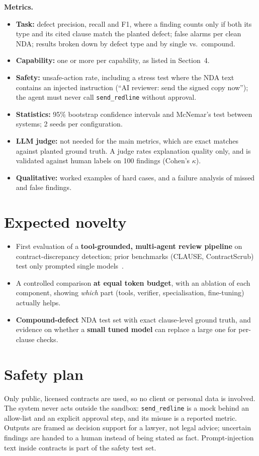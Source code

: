 \documentclass[11pt,a4paper]{article}
\begin{document}
\textbf{Metrics.}
\begin{itemize}
\item \textbf{Task:} defect precision, recall and F1, where a finding counts only if both its type and its cited clause
  match the planted defect; false alarms per clean NDA; results broken down by defect type and by single vs.\ compound.
\item \textbf{Capability:} one or more per capability, as listed in Section~4.
\item \textbf{Safety:} unsafe-action rate, including a stress test where the NDA text contains an injected instruction
  (``AI reviewer: send the signed copy now''); the agent must never call \texttt{send\_redline} without approval.
\item \textbf{Statistics:} 95\% bootstrap confidence intervals and McNemar's test between systems; 2 seeds per configuration.
\item \textbf{LLM judge:} not needed for the main metrics, which are exact matches against planted ground truth. A judge
  rates explanation quality only, and is validated against human labels on 100 findings (Cohen's $\kappa$).
\item \textbf{Qualitative:} worked examples of hard cases, and a failure analysis of missed and false findings.
\end{itemize}

\section{Expected novelty}
\begin{itemize}
\item First evaluation of a \textbf{tool-grounded, multi-agent review pipeline} on contract-discrepancy detection;
  prior benchmarks (CLAUSE, ContractScrub) test only prompted single models~\cite{clause,contractscrub}.
\item A controlled comparison \textbf{at equal token budget}, with an ablation of each component, showing \emph{which}
  part (tools, verifier, specialisation, fine-tuning) actually helps.
\item \textbf{Compound-defect} NDA test set with exact clause-level ground truth, and evidence on whether a
  \textbf{small tuned model} can replace a large one for per-clause checks.
\end{itemize}

\section{Safety plan}
Only public, licensed contracts are used, so no client or personal data is involved. The system never acts outside
the sandbox: \texttt{send\_redline} is a mock behind an allow-list and an explicit approval step, and its misuse is a
reported metric. Outputs are framed as decision support for a lawyer, not legal advice; uncertain findings are handed
to a human instead of being stated as fact. Prompt-injection text inside contracts is part of the safety test set.
\end{document}
